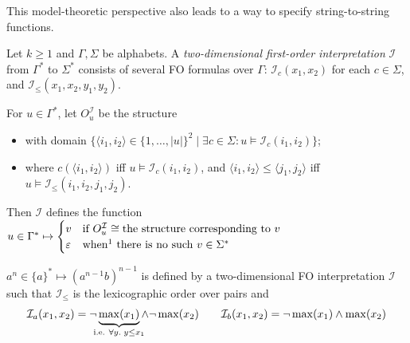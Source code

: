 \documentclass{fundam}
\newcommand{\cI}{\mathcal{I}}
\theoremstyle{claimstyle}
\begin{document}
This model-theoretic perspective also leads to a way to specify string-to-string functions.
\begin{definition}
  \label{def:fo-interp}
  Let $k\geq1$ and $\Gamma,\Sigma$ be alphabets.
  A \emph{two-dimensional first-order interpretation} $\cI$ from $\Gamma^*$ to
  $\Sigma^*$ consists of several FO formulas over $\Gamma$: $\cI_c(x_1,x_2)$
  for each $c\in\Sigma$, and $\cI_\leq(x_1,x_2,y_1,y_2)$.

  For $u\in\Gamma^*$, let $O^\cI_u$ be the structure
  \begin{itemize}
  \item with domain $\{ \langle i_1,i_2 \rangle \in \{1,\dots,|u|\}^2 \mid \exists c\in\Sigma \colon u \models \cI_c(i_1,i_2) \}$;
    \item where $c(\langle i_1,i_2\rangle)$ iff $u \models \cI_c(i_1,i_2)$, and $\langle i_1,i_2\rangle \leq\langle j_1,j_2\rangle$ iff $u\models\cI_\leq(i_1,i_2,j_1,j_2)$.
  \end{itemize}
  Then $\cI$ defines the function
  $u \in \Gamma^* \mapsto \displaystyle\begin{cases}
                                         v & \text{if}\ O^\cI_u \cong \text{the structure corresponding to}\ v\\
                                         \varepsilon & \text{when\footnotemark{} there is no such}\ v \in \Sigma^*
                                       \end{cases}$\\

\end{definition}
\begin{example}\label{exa:interp0}
  $a^n \in\{a\}^* \mapsto (a^{n-1}b)^{n-1}$ is defined by a two-dimensional FO interpretation $\cI$ such that $\cI_\leq$ is the lexicographic order over pairs and
  \[ \cI_a(x_1,x_2) = \lnot\underbrace{\max(x_1)}_{\mathclap{\text{i.e.}\ \forall y.\; y \leq x_1}} \land \lnot\max(x_2) \qquad \cI_b(x_1,x_2) = \lnot\max(x_1) \land \max(x_2) \]
\end{example}
\end{document}
